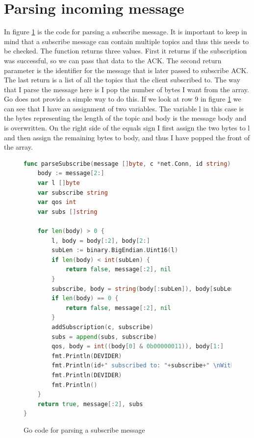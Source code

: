 \documentclass{article}
\begin{document}
\section{Parsing incoming message}
In figure \ref{fig:parseCode} is the code for parsing a subscribe message. It is important to keep in mind that a subscribe message can contain multiple topics and thus this needs to be checked. The function returns three values. First it returns if the subscription was successful, so we can pass that data to the ACK. The second return parameter is the identifier for the message that is later passed to subscribe ACK. The last return is a list of all the topics that the client subscribed to. The way that I parse the message here is I pop the number of bytes I want from the array. Go does not provide a simple way to do this. If we look at row 9 in figure \ref{fig:parseCode} we can see that I have an assignment of two variables. The variable l in this case is the bytes representing the length of the topic and body is the message body and is overwritten. On the right side of the equals sign I first assign the two bytes to l and then assign the remaining bytes to body, and thus I have popped the front of the array.
\begin{figure}[H]
    \begin{lstlisting}[language=go]
func parseSubscribe(message []byte, c *net.Conn, id string) (bool, []byte, []string) {
	body := message[2:]
	var l []byte
	var subscribe string
	var qos int
	var subs []string

	for len(body) > 0 {
		l, body = body[:2], body[2:]
		subLen := binary.BigEndian.Uint16(l)
		if len(body) < int(subLen) {
			return false, message[:2], nil
		}
		subscribe, body = string(body[:subLen]), body[subLen:]
		if len(body) == 0 {
			return false, message[:2], nil
		}
		addSubscription(c, subscribe)
		subs = append(subs, subscribe)
		qos, body = int((body[0] & 0b00000011)), body[1:]
		fmt.Println(DEVIDER)
		fmt.Println(id+" subscribed to: "+subscribe+" \nWith QOS of:", qos)
		fmt.Println(DEVIDER)
		fmt.Println()
	}
	return true, message[:2], subs
}
    \end{lstlisting}
    \label{fig:parseCode}
    \caption{Go code for parsing a subscribe message}
\end{figure}

\newpage
\end{document}
